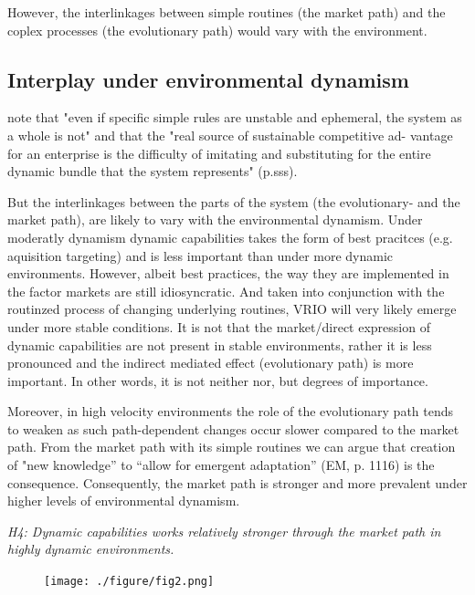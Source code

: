 \documentclass[review,fleqn]{elsarticle}\usepackage[]{graphicx}\usepackage[]{color}
\begin{document}
However, the interlinkages between simple routines (the market path) and the coplex
processes (the evolutionary path) would vary with the environment.

\subsection{Interplay under environmental dynamism}

\cite{DiStefano2014} note that "even if specific simple rules are unstable and ephemeral,
the system as a whole is not" and that the "real source of sustainable competitive ad- vantage for an enterprise is the difficulty of imitating and substituting for the entire dynamic bundle that the system represents" (p.sss).

But the interlinkages between the parts of the system (the evolutionary- and the market
path), are likely to vary with the environmental dynamism. Under moderatly dynamism
dynamic capabilities takes the form of best pracitces (e.g. aquisition targeting) and is
less important than under more dynamic environments. However, albeit best practices, the
way they are implemented in the factor markets are still idiosyncratic. And taken into
conjunction with the routinzed process of changing underlying routines, VRIO will very
likely emerge under more stable conditions. It is not that the market/direct expression
of dynamic capabilities are not present in stable environments, rather it is less pronounced and the indirect
mediated effect (evolutionary path) is more important. In other words, it is not neither
nor, but degrees of importance.

Moreover, in high velocity environments the role of the evolutionary path tends to
weaken as such path-dependent changes occur slower compared to the market path. From the
market path with its simple routines we can argue that creation of "new knowledge” to
“allow for emergent adaptation” (EM, p. 1116) is the consequence. Consequently, the market
path is stronger and more prevalent under higher levels of environmental dynamism.

\emph{H4: Dynamic capabilities works relatively stronger through the market path in highly
dynamic environments.}


\begin{figure}
  \centering
  \captionsetup{width=0.5\linewidth}
  \texttt{[image: ./figure/fig2.png]}
  \label{fig:fig2}
\end{figure}
\end{document}
